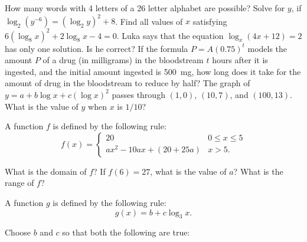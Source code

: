 \begin{questions}
  \question How many words with 4 letters of a 26 letter alphabet are possible?
  \question Solve for $ y $, if $ \log_2 (y^{-6}) = (\log_2 y)^2 + 8 $.
  \question Find all values of $ x $ satisfying $ 6(\log_8 x)^2 + 2 \log_8 x - 4 = 0 $.
  \question Luka says that the equation $ \log_x (4x + 12) = 2 $ has only one solution. Is he correct?
  \question If the formula $ P = A(0.75)^t $ models the amount $ P $ of a drug (in milligrams) in the bloodstream $ t $ hours after it
            is ingested, and the initial amount ingested is \SI{500}{\milli\gram}, how long does it take for the amount of drug in the
            bloodstream to reduce by half?
  \question The graph of $ y = a + b\log x + c (\log x)^2 $ passes through $ (1,0) $, $ (10, 7) $, and $ (100, 13) $.
            What is the value of $ y $ when $ x $ is $ 1/10 $?
  \question
    \begin{parts}
      \item A function $ f $ is defined by the following rule:
            \begin{displaymath}
              f(x) = \begin{cases}
                      20 & 0 \leq x \leq 5\\
                      ax^2 - 10ax + (20 + 25a) & x > 5.
                    \end{cases}
            \end{displaymath}
        \begin{subparts}
          \subpart What is the domain of $ f $?
          \subpart If $ f(6) = 27 $, what is the value of $ a $?
          \subpart What is the range of $ f $?
        \end{subparts}
      \item A function $ g $ is defined by the following rule:
            \begin{displaymath}
              g(x) = b + c\log_3 x.
            \end{displaymath}
        \begin{subparts}
          \subpart Choose $ b $ and $ c $ so that both the following are true:
            \begin{itemize}

\end{itemize}
\end{subparts}
\end{parts}
\end{questions}

